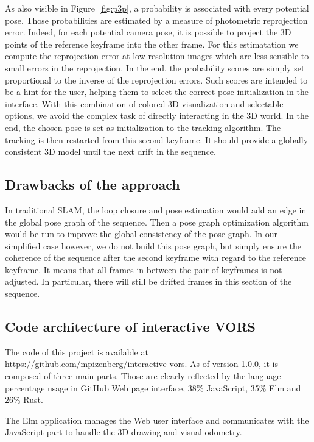 As also visible in Figure~\ref{fig:p3p}, a probability is associated with every potential pose.
Those probabilities are estimated by a measure of photometric reprojection error.
Indeed, for each potential camera pose, it is possible to project the 3D points
of the reference keyframe into the other frame.
For this estimatation we compute the reprojection error at low resolution images
which are less sensible to small errors in the reprojection.
In the end, the probability scores are simply set proportional to the inverse of the reprojection errors.
Such scores are intended to be a hint for the user,
helping them to select the correct pose initialization in the interface.
With this combination of colored 3D visualization and selectable options,
we avoid the complex task of directly interacting in the 3D world.
In the end, the chosen pose is set as initialization to the tracking algorithm.
The tracking is then restarted from this second keyframe.
It should provide a globally consistent 3D model until the next drift in the sequence.

\subsection{Drawbacks of the approach}%
\label{sub:drawbacks}

In traditional SLAM, the loop closure and pose estimation would add
an edge in the global pose graph of the sequence.
Then a pose graph optimization algorithm would be run to improve the global
consistency of the pose graph.
In our simplified case however, we do not build this pose graph,
but simply ensure the coherence of the sequence after the second keyframe
with regard to the reference keyframe.
It means that all frames in between the pair of keyframes is not adjusted.
In particular, there will still be drifted frames in this section of the sequence.

\subsection{Code architecture of interactive VORS}%
\label{sub:code-interactive-vors}

The code of this project is available at https://github.com/mpizenberg/interactive-vors.
As of version 1.0.0, it is composed of three main parts.
Those are clearly reflected by the language percentage usage in GitHub Web page interface,
38\% JavaScript, 35\% Elm and 26\% Rust.

The Elm application manages the Web user interface and communicates
with the JavaScript part to handle the 3D drawing and visual odometry.

